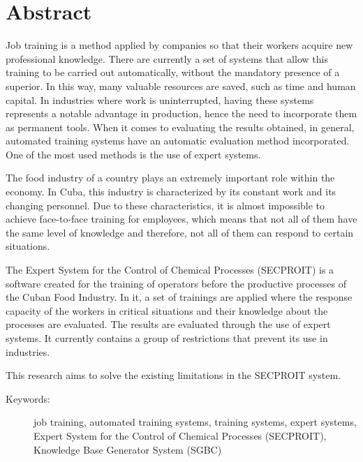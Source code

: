 \section*{Abstract}
Job training is a method applied by companies so that their workers acquire new professional knowledge. There are currently a set of systems that allow this training to be carried out automatically, without the mandatory presence of a superior. In this way, many valuable resources are saved, such as time and human capital.
In industries where work is uninterrupted, having these systems represents a notable advantage in production, hence the need to incorporate them as permanent tools.
When it comes to evaluating the results obtained, in general, automated training systems have an automatic evaluation method incorporated. One of the most used methods is the use of expert systems.

The food industry of a country plays an extremely important role within the economy. In Cuba, this industry is characterized by its constant work and its changing personnel. Due to these characteristics, it is almost impossible to achieve face-to-face training for employees, which means that not all of them have the same level of knowledge and therefore, not all of them can respond to certain situations.

The Expert System for the Control of Chemical Processes (SECPROIT) is a software created for the training of operators before the productive processes of the Cuban Food Industry. In it, a set of trainings are applied where the response capacity of the workers in critical situations and their knowledge about the processes are evaluated. The results are evaluated through the use of expert systems. It currently contains a group of restrictions that prevent its use in industries.

This research aims to solve the existing limitations in the SECPROIT system.

\vfill

\begin{description}
	\item[Keywords:]{job training, automated training systems, training systems, expert systems, Expert System for the Control of Chemical Processes (SECPROIT), Knowledge Base Generator System (SGBC)}
\end{description}
